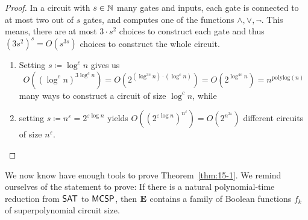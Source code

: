 \documentclass[11pt]{article}
\begin{document}
\begin{proof}
  In a circuit with $s \in {\mathbb{N}}$ many gates and inputs, each gate is connected to
  at most two out of $s$ gates, and computes one of the functions
  $\land, \lor, \neg$.
  This means, there are at most $3 \cdot s^2$ choices to construct each gate
  and thus $(3 s^2)^s = O(s^{3s})$ choices to construct the whole circuit.

  \begin{enumerate}
    \item Setting $s \coloneqq \log^c n$ gives us
      \[
        O((\log^c n)^{3 \log^c n})
        =
        O(2^{(\log^{3c} n) \cdot (\log^c n)})
        =
        O(2^{\log^{4c} n})
        =
        n^{\mathrm{polylog}(n)}
      \]
      many ways to construct a circuit of size $\log^c n$, while

    \item setting $s \coloneqq n^\varepsilon = 2^{\varepsilon \log n}$ yields
      $
        O((2^{\varepsilon \log n})^{n^\varepsilon})
        =
        O(2^{n^{2 \varepsilon}})
      $
      different circuits of size $n^\varepsilon$.
  \end{enumerate}
\end{proof}

We now know have enough tools to prove Theorem~\ref{thm:15-1}.
We remind ourselves of the statement to prove:
If there is a natural polynomial-time reduction from
$\mathsf{SAT}$ to $\mathsf{MCSP}$, then $\mathbf{E}$
contains a family of Boolean functions $f_k$ of superpolynomial circuit
size.
\end{document}
